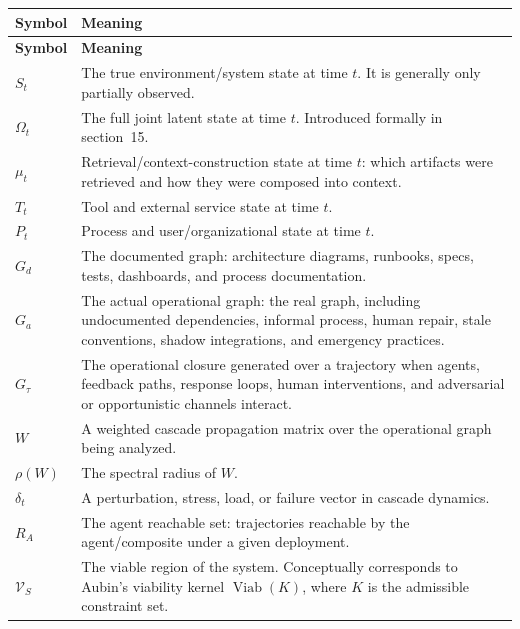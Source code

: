 \documentclass[11pt]{article}
\DeclareMathOperator{\Viab}{Viab}
\begin{document}
\begin{small}
\begin{longtable}{>{\raggedright\arraybackslash}p{2.2cm}>{\raggedright\arraybackslash}p{12.5cm}}
\toprule
\textbf{Symbol} & \textbf{Meaning} \\
\midrule
\endfirsthead
\toprule
\textbf{Symbol} & \textbf{Meaning} \\
\midrule
\endhead
$S_t$              & The true environment/system state at time $t$. It is generally only partially observed. \\
$\Omega_t$         & The full joint latent state at time $t$. Introduced formally in section~15. \\
$\mu_t$            & Retrieval/context-construction state at time $t$: which artifacts were retrieved and how they were composed into context. \\
$T_t$              & Tool and external service state at time $t$. \\
$P_t$              & Process and user/organizational state at time $t$. \\
$G_d$              & The documented graph: architecture diagrams, runbooks, specs, tests, dashboards, and process documentation. \\
$G_a$              & The actual operational graph: the real graph, including undocumented dependencies, informal process, human repair, stale conventions, shadow integrations, and emergency practices. \\
$G_\tau$           & The operational closure generated over a trajectory when agents, feedback paths, response loops, human interventions, and adversarial or opportunistic channels interact. \\
$W$                & A weighted cascade propagation matrix over the operational graph being analyzed. \\
$\rho(W)$          & The spectral radius of $W$. \\
$\delta_t$         & A perturbation, stress, load, or failure vector in cascade dynamics. \\
$R_A$              & The agent reachable set: trajectories reachable by the agent/composite under a given deployment. \\
$\mathcal{V}_S$    & The viable region of the system. Conceptually corresponds to Aubin's viability kernel $\Viab(K)$, where $K$ is the admissible constraint set. \\
\bottomrule
\end{longtable}
\end{small}
\end{document}
